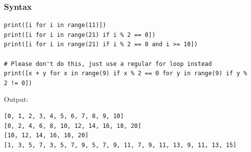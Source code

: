 \documentclass[11pt]{article}
\begin{document}
\subsubsection{Syntax}
\label{sec:org922ced8}
\begin{verbatim}
print([i for i in range(11)])
print([i for i in range(21) if i % 2 == 0])
print([i for i in range(21) if i % 2 == 0 and i >= 10])

# Please don't do this, just use a regular for loop instead
print([x + y for x in range(9) if x % 2 == 0 for y in range(9) if y % 2 != 0])
\end{verbatim}

 \noindent Output:

\begin{verbatim}
[0, 1, 2, 3, 4, 5, 6, 7, 8, 9, 10]
[0, 2, 4, 6, 8, 10, 12, 14, 16, 18, 20]
[10, 12, 14, 16, 18, 20]
[1, 3, 5, 7, 3, 5, 7, 9, 5, 7, 9, 11, 7, 9, 11, 13, 9, 11, 13, 15]
\end{verbatim}


 \newpage
\end{document}
